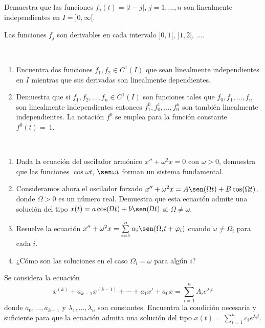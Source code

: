 \begin{ejercicio}\label{ej:4.9}
    Demuestra que las funciones $f_j(t) = |t - j|$, $j = 1, \ldots, n$ son linealmente independientes en $I = ]0, \infty[$.
    \begin{observacion}
        Las funciones $f_j$ son derivables en cada intervalo $]0, 1[$, $]1, 2[$, $\ldots$.
    \end{observacion}
\end{ejercicio}

\begin{ejercicio}\label{ej:4.10}~
    \begin{enumerate}
        \item Encuentra dos funciones $f_1, f_2 \in C^1(I)$ que sean linealmente independientes en $I$ mientras que sus derivadas son linealmente dependientes.
        \item Demuestra que si $f_1, f_2, \ldots, f_n \in C^1(I)$ son funciones tales que $f_0, f_1, \ldots, f_n$ son linealmente independientes entonces $f_1^0, f_0^1, \ldots, f_0^n$ son también linealmente independientes. La notación $f^0$ se emplea para la función constante $f^0(t)=~1$.
    \end{enumerate}
\end{ejercicio}

\begin{ejercicio}\label{ej:4.11}~
    \begin{enumerate}
        \item Dada la ecuación del oscilador armónico $x'' + \omega^2 x = 0$ con $\omega > 0$, demuestra que las funciones $\cos \omega t$, $\sen \omega t$ forman un sistema fundamental.
        \item Consideramos ahora el oscilador forzado $x'' + \omega^2 x = A \sen(\Omega t) + B \cos(\Omega t)$, donde $\Omega > 0$ es un número real. Demuestra que esta ecuación admite una solución del tipo $x(t) = a \cos(\Omega t) + b \sen(\Omega t)$ si $\Omega \neq \omega$.
        \item Resuelve la ecuación $x'' + \omega^2 x = \sum\limits_{i = 1}^n \alpha_i \sen(\Omega_i t + \varphi_i)$ cuando $\omega \neq \Omega_i$ para cada $i$.
        \item ¿Cómo son las soluciones en el caso $\Omega_i = \omega$ para algún $i$?
    \end{enumerate}
\end{ejercicio}

\begin{ejercicio}\label{ej:4.12}
    Se considera la ecuación
    \[
        x^{(k)} + a_{k-1}x^{(k-1)} + \cdots + a_1x' + a_0x = \sum_{i = 1}^n A_i e^{\lambda_i t}
    \]
    donde $a_0, \ldots, a_{k-1}$ y $\lambda_1, \ldots, \lambda_n$ son constantes. Encuentra la condición necesaria y suficiente para que la ecuación admita una solución del tipo $x(t) = \sum\limits_{i = 1}^n c_i e^{\lambda_i t}$.
\end{ejercicio}